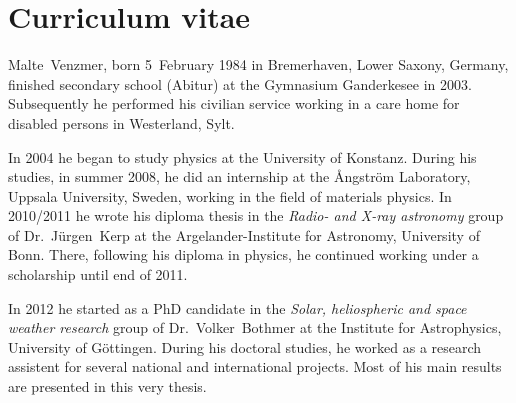 
\chapter*{Curriculum vitae}


Malte~Venzmer, born 5~February 1984 in Bremerhaven, Lower Saxony, Germany, finished secondary school (Abitur) at the Gymnasium Ganderkesee in 2003. Subsequently he performed his civilian service working in a care home for disabled persons in Westerland, Sylt.

In 2004 he began to study physics at the University of Konstanz. During his studies, in summer 2008, he did an internship at the \AA{}ngström Laboratory, Uppsala University, Sweden, working in the field of materials physics. In 2010/2011 he wrote his diploma thesis in the \textit{Radio- and X-ray astronomy} group of Dr.~Jürgen~Kerp at the Argelander-Institute for Astronomy, University of Bonn. There, following his diploma in physics, he continued working under a scholarship until end of 2011.

In 2012 he started as a PhD candidate in the \textit{Solar, heliospheric and space weather research} group of Dr.~Volker~Bothmer at the Institute for Astrophysics, University of Göttingen. During his doctoral studies, he worked as a research assistent for several national and international projects. Most of his main results are presented in this very thesis.



